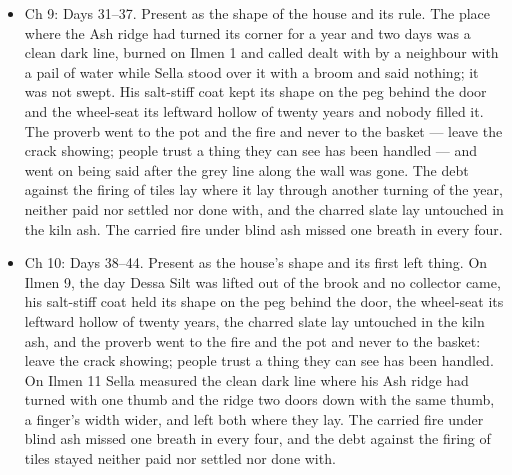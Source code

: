 \documentclass{design/chronicle}
\begin{document}
{\begin{itemize}[leftmargin=1.4em,itemsep=1pt,topsep=3pt,parsep=0pt]

\item Ch 9: Days 31–37. Present as the shape of the house and its rule. The place where the Ash ridge had turned its corner for a year and two days was a clean dark line, burned on Ilmen 1 and called dealt with by a neighbour with a pail of water while Sella stood over it with a broom and said nothing; it was not swept. His salt-stiff coat kept its shape on the peg behind the door and the wheel-seat its leftward hollow of twenty years and nobody filled it. The proverb went to the pot and the fire and never to the basket --- leave the crack showing; people trust a thing they can see has been handled --- and went on being said after the grey line along the wall was gone. The debt against the firing of tiles lay where it lay through another turning of the year, neither paid nor settled nor done with, and the charred slate lay untouched in the kiln ash. The carried fire under blind ash missed one breath in every four.

\end{itemize}

\begin{itemize}[leftmargin=1.4em,itemsep=1pt,topsep=3pt,parsep=0pt]

\item Ch 10: Days 38–44. Present as the house’s shape and its first left thing. On Ilmen 9, the day Dessa Silt was lifted out of the brook and no collector came, his salt-stiff coat held its shape on the peg behind the door, the wheel-seat its leftward hollow of twenty years, the charred slate lay untouched in the kiln ash, and the proverb went to the fire and the pot and never to the basket: leave the crack showing; people trust a thing they can see has been handled. On Ilmen 11 Sella measured the clean dark line where his Ash ridge had turned with one thumb and the ridge two doors down with the same thumb, a finger’s width wider, and left both where they lay. The carried fire under blind ash missed one breath in every four, and the debt against the firing of tiles stayed neither paid nor settled nor done with.

\end{itemize}
}
\end{document}

